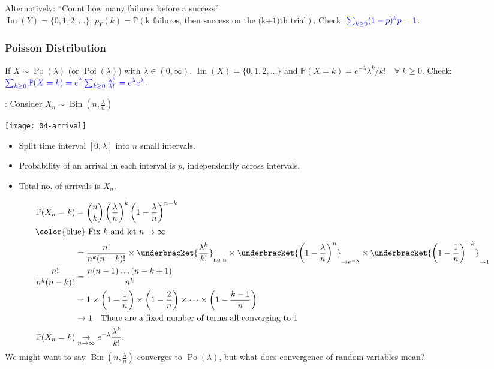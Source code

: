 Alternatively: ``Count how many failures before a success'' \\
$\operatorname{Im}(Y) = \{0, 1, 2, \dots\}$, $p_Y(k) = \mathbb{P}(\text{k failures, then success on the (k+1)th trial})$.
\color{blue} Check: $\mathcolor{blue}{\sum_{k \geq 0} (1-p)^{k} p = 1}$.\color{black}

\subsubsection{Poisson Distribution}
If $X \sim \operatorname{Po}(\lambda)$ (or $\operatorname{Poi}(\lambda)$) with $\lambda \in (0, \infty)$.
$\operatorname{Im}(X) = \{0, 1, 2, \dots\}$ and $\mathbb{P}(X = k) = e^{- \lambda} \lambda^k / k! \quad \forall \; k \geq 0$.
\color{blue} Check: $\mathcolor{blue}{\sum_{k \geq 0} \mathbb{P}(X = k) = e^{^\lambda} \sum_{k \geq 0} \frac{\lambda^k}{k!} = e^{\lambda} e^\lambda}$.\color{black}

: Consider $X_n \sim \operatorname{Bin}(n, \frac{\lambda}{n})$
    \begin{example}
    {\par \centering \texttt{[image: 04-arrival]} \par}
    \begin{itemize}
        \item Split time interval $[0, \lambda]$ into $n$ small intervals.
        \item Probability of an arrival in each interval is $p$, independently across intervals.
        \item Total no. of arrivals is $X_n$.
    \end{itemize} 

    \begin{align*}
        \mathbb{P}(X_n = k) &= \binom{n}{k} \left(\frac{\lambda}{n}\right)^k \left(1 - \frac{\lambda}{n}\right)^{n - k} \\
        \intertext{\color{blue} Fix $k$ and let $n \to \infty$}
        &= \frac{n!}{n^k (n - k)!} \times \underbracket{\frac{\lambda^k}{k!}}_{\text{no n}} \times \underbracket{\left(1 - \frac{\lambda}{n}\right)^n}_{\to e^{-\lambda}} \times \underbracket{\left(1 - \frac{1}{n}\right)^{-k}}_{\to 1} \\
        \frac{n!}{n^k (n - k)!} &= \frac{n (n-1) \dots (n - k + 1)}{n^k} \\
        &= 1 \times \left(1 - \frac{1}{n}\right) \times \left(1 - \frac{2}{n}\right) \times \dots \times \left(1 - \frac{k - 1}{n}\right) \\
        &\to 1 \quad \text{There are a fixed number of terms all converging to 1} \\
        \mathbb{P}(X_n = k) &\underset{n \to \infty}{\to} e^{-\lambda} \frac{\lambda^k}{k!}.
    \end{align*} 
    \color{blue} We might want to say $\operatorname{Bin}(n, \frac{\lambda}{n})$ converges to $\operatorname{Po}(\lambda)$, but what does convergence of random variables mean?
\end{example}

